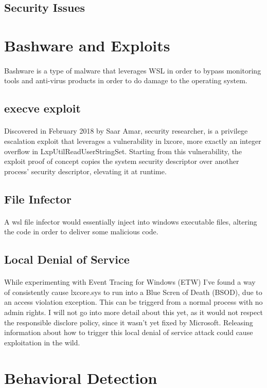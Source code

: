         
        \subsection{Security Issues}
        
        
    \section{Bashware and Exploits}
        \paragraph{}
        Bashware is a type of malware that leverages WSL in order to bypass monitoring tools and anti-virus products in order to do damage to the
        operating system.
        
        \subsection{execve exploit}
            \paragraph{}
            Discovered in February 2018 by Saar Amar, security researcher, is a privilege escalation exploit that leverages a vulnerability in
            lxcore, more exactly an integer overflow in LxpUtilReadUserStringSet. Starting from this vulnerability, the exploit proof of concept
            copies the system security descriptor over another process' security descriptor, elevating it at runtime.

        \subsection{File Infector}
            \paragraph{}
            A wsl file infector would essentially inject into windows executable files, altering the code in order to deliver some malicious
            code.
            
        \subsection{Local Denial of Service}
            \paragraph{}
            While experimenting with Event Tracing for Windows (ETW) I've found a way of consistently cause lxcore.sys to run into a Blue Scren
            of Death (BSOD), due to an access violation exception. This can be triggerd from a normal process with no admin rights. I will not
            go into more detail about this yet, as it would not respect the responsible disclore policy, since it wasn't yet fixed by Microsoft.
            Releasing information about how to trigger this local denial of service attack could cause exploitation in the wild.

    \section{Behavioral Detection}
        \paragraph{}
        